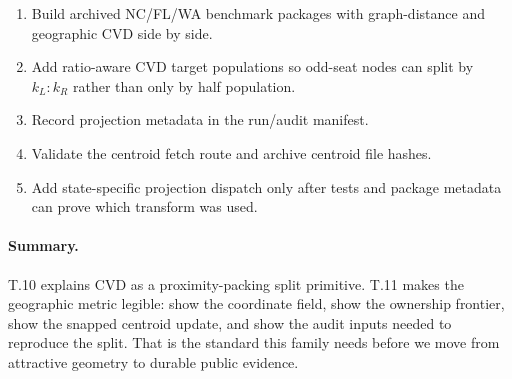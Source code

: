 \begin{enumerate}
\item Build archived NC/FL/WA benchmark packages with graph-distance and
  geographic CVD side by side.
\item Add ratio-aware CVD target populations so odd-seat nodes can split by
  $k_L:k_R$ rather than only by half population.
\item Record projection metadata in the run/audit manifest.
\item Validate the centroid fetch route and archive centroid file hashes.
\item Add state-specific projection dispatch only after tests and package
  metadata can prove which transform was used.
\end{enumerate}

\paragraph{Summary.}
T.10 explains CVD as a proximity-packing split primitive. T.11 makes the
geographic metric legible: show the coordinate field, show the ownership
frontier, show the snapped centroid update, and show the audit inputs needed
to reproduce the split. That is the standard this family needs before we move
from attractive geometry to durable public evidence.
